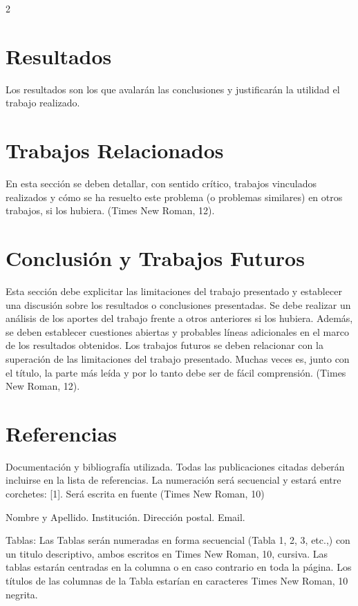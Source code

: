 \begin{multicols}{2}
\section{Resultados}

Los resultados son los que avalarán las conclusiones y justificarán la utilidad el trabajo realizado.

\section{Trabajos Relacionados}

En esta sección se deben detallar, con sentido crítico, trabajos vinculados realizados y cómo se ha resuelto este problema (o problemas similares) en otros trabajos, si los hubiera. (Times New Roman, 12).

\section{Conclusión y Trabajos Futuros}

Esta sección debe explicitar las limitaciones del trabajo presentado y establecer una discusión sobre los resultados o conclusiones presentadas. Se debe realizar un análisis de los aportes del trabajo frente a otros anteriores si los hubiera. Además, se deben establecer cuestiones abiertas y probables líneas adicionales en el marco de los resultados obtenidos. Los trabajos futuros se deben relacionar con la superación de las limitaciones del trabajo presentado. Muchas veces es, junto con el título, la parte más leída y por lo tanto debe ser de fácil comprensión. (Times New Roman, 12).

\section{Referencias}

Documentación y bibliografía utilizada. Todas las publicaciones citadas deberán incluirse en la lista de referencias. La numeración será secuencial y estará entre corchetes: [1]. Será escrita en fuente (Times New Roman, 10)




{\it\footnotesize

Nombre y Apellido. Institución. Dirección postal. Email. 

\par}


Tablas: Las Tablas serán numeradas en forma secuencial (Tabla 1, 2, 3, etc.,) con un titulo descriptivo, ambos escritos en Times New Roman, 10, cursiva. Las tablas estarán centradas en la columna o en caso contrario en toda la página. Los títulos de las columnas de la Tabla estarían en caracteres Times New Roman, 10 negrita.



\end{multicols}
